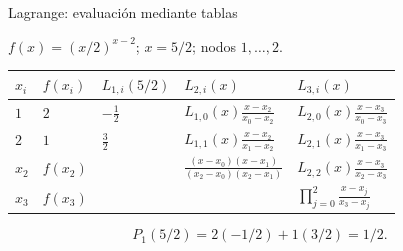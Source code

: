 \documentclass[original_version/main.tex]{subfiles}
\begin{document}
\begin{frame}[t]{Lagrange: evaluación mediante tablas}
\par\noindent\begin{minipage}[t][12mm][t]{\textwidth}\small\strut $f(x)=(x/2)^{x-2}$; $x=5/2$; nodos $1,\ldots,2$.\end{minipage}\par\nointerlineskip
\begin{minipage}[t]{\textwidth}\begingroup\scriptsize\setlength{\tabcolsep}{3pt}\begin{center}\begin{tabular}{|C{.065\textwidth}|C{.095\textwidth}|C{.19\textwidth}|C{.25\textwidth}|C{.25\textwidth}|}\hline
\rule[-2mm]{0pt}{6mm}$x_i$&$f(x_i)$&$L_{1,i}(5/2)$&$L_{2,i}(x)$&$L_{3,i}(x)$\\\hline
\rule[-2.5mm]{0pt}{9mm}$1$&$2$&$-\frac12$&$L_{1,0}(x)\frac{x-x_2}{x_0-x_2}$&$L_{2,0}(x)\frac{x-x_3}{x_0-x_3}$\\\hline
\rule[-2.5mm]{0pt}{9mm}$2$&$1$&$\frac32$&$L_{1,1}(x)\frac{x-x_2}{x_1-x_2}$&$L_{2,1}(x)\frac{x-x_3}{x_1-x_3}$\\\hline
\rule[-2.5mm]{0pt}{9mm}$x_2$&$f(x_2)$&&$\frac{(x-x_0)(x-x_1)}{(x_2-x_0)(x_2-x_1)}$&$L_{2,2}(x)\frac{x-x_3}{x_2-x_3}$\\\hline
\rule[-2.5mm]{0pt}{9mm}$x_3$&$f(x_3)$&&&$\prod_{j=0}^2\frac{x-x_j}{x_3-x_j}$\\\hline
\end{tabular}\end{center}\endgroup\par
\end{minipage}\par\[P_1(5/2)=2(-1/2)+1(3/2)=1/2.\]
\end{frame}
\end{document}
